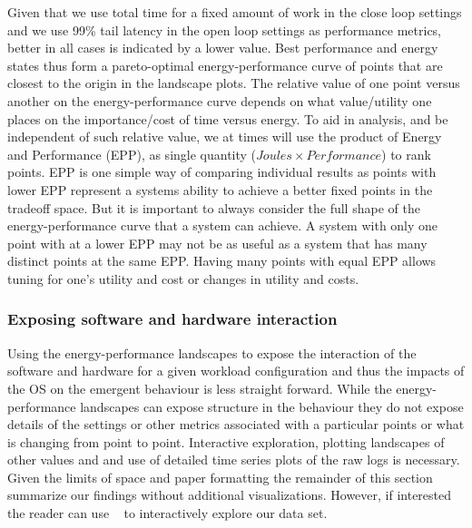 Given that we use total time for a fixed amount of work in the close loop settings and we use 99\% tail latency in the open loop settings as performance metrics, better in all cases is indicated by a lower value.  Best performance and energy states thus form a pareto-optimal energy-performance curve of points that are closest to the origin in the landscape plots.  The relative value of one point versus another on the energy-performance curve depends on what value/utility one places on the importance/cost of time versus energy.   To aid in analysis, and be independent of such relative value, we at times will use the product of  Energy and Performance  (EPP), as single quantity ($Joules \times Performance$) to rank points.  EPP is one simple way of comparing individual results as points with lower EPP represent a systems ability to achieve a better fixed points in the tradeoff space.  But it is important to always consider the full shape of the energy-performance curve that a system can achieve.  A system with only one point with at a lower EPP may not be as useful as a system that has many distinct points at the same EPP.  Having many points with equal EPP allows tuning for one's utility and cost or changes in utility and costs.    

\subsubsection{Exposing software and hardware interaction}

Using the energy-performance landscapes to expose the interaction of the software and hardware for a given workload configuration and thus the impacts of the OS on the emergent behaviour is less straight forward.  While the energy-performance landscapes can expose structure in the behaviour  they do not expose details of the settings or other metrics associated with a particular points or what is changing from point to point.  Interactive exploration, plotting landscapes of other values and and use of detailed time series plots of the raw logs is necessary.  Given the limits of space and paper formatting the remainder of this section summarize our findings without additional visualizations.  However, if interested the reader can use ~\cite{dashboard} to interactively explore our data set.


